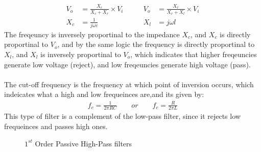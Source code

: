 \documentclass[12pt]{article}
\begin{document}
\begin{equation}
\begin{aligned}
            V_o &= \frac{X_c}{X_c + X_r} \times V_i  \quad\quad &V_o &= \frac{X_r}{X_r + X_l} \times V_i\\
            X_c &= \frac{1}{j\omega c}  &X_l &= j\omega l
\end{aligned}
\end{equation}
The freqeuncy is inversely proportinal to the impedance $X_c$, and $X_c$ is directly proportinal to $V_o$, and by the same logic the frequency is directly proportinal to $X_l$, and $X_l$ is inversely proportinal to $V_o$, which indicates that higher freqeuncies generate low voltage (reject), and low freqeuncies generate high voltage (pass).\\ \\
The cut-off frequency is the frequency at which point of inversion occurs, which indeicates what a high and low frequeinces are,and its given by:
\begin{equation}
    \begin{aligned}
        f_c = \frac{1}{2\pi R C} \quad\quad or \quad\quad f_c = \frac{R}{2\pi L}
    \end{aligned}
\end{equation}
This type of filter is a complement of the low-pass filter, since it rejects low frequeinces  and passes high ones.
\begin{figure}[H]
    \centering
    \label{fig:High-Pass}
    \caption{$1^{st}$ Order Passive High-Pass filters}
\end{figure}
\end{document}
